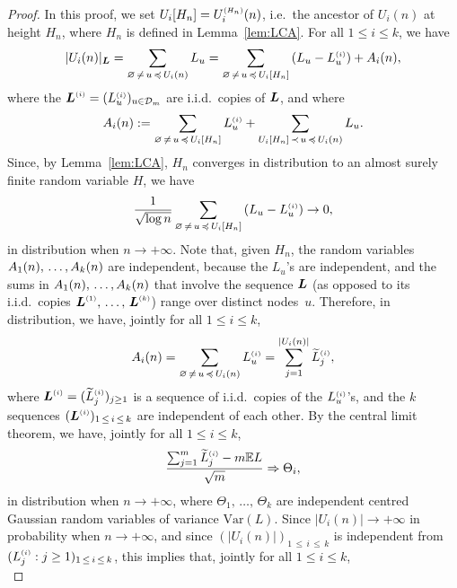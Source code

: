 \documentclass[10pt]{amsart}
\theoremstyle{definition}\newtheorem{defi}[theo]{Definition}\newtheorem{rema}[theo]{Remark}\newtheorem{exam}[theo]{Example}\newtheorem{exem}[theo]{Example}\newtheorem{nota}[theo]{Notation}
\newcommand{\bs}{\ensuremath{\boldsymbol}}
\newcommand{\sss}{\ensuremath{\scriptscriptstyle}}
\newcommand{\bbE}{\mathbb{E}}
\newcommand{\clD}{\mathcal{D}}
\newcommand{\Var}{\mathrm{Var}}
\begin{document}
\begin{proof}
In this proof, we set $U_i[H_n] = U_i^{\sss (H_n)}(n)$, i.e.\ the ancestor of $U_i(n)$ at height $H_n$, where $H_n$ is defined in Lemma~\ref{lem:LCA}. For all $1\leq i\leq k$, we have
\begin{equation}\label{eq:Ai}
|U_i(n)|_{\bs L} = \sum_{\varnothing\,\neq\,u\,\preccurlyeq\,U_i(n)} L_u = \sum_{\varnothing\,\neq\,u\,\preccurlyeq\,U_i[H_n]} \left(L_u - L_u^{\sss (i)}\right) + A_i(n),
\end{equation}
where the $\bs L^{\sss (i)} = (L_u^{\sss (i)})_{u\in\clD_m}$ are i.i.d.\ copies of $\bs L$, and where
\[
A_i(n):=\sum_{\varnothing\,\neq\,u\,\preccurlyeq\,U_i[H_n]} L^{\sss (i)}_u +\sum_{U_i[H_n]\,\prec\,u\,\preccurlyeq\,U_i(n)} L_u.
\]
Since, by Lemma~\ref{lem:LCA}, $H_n$ converges in distribution to an almost surely finite random variable $H$, we have
\begin{equation}\label{eq:LLN_change_dist}
\frac1{\sqrt{\log n}}
\sum_{\varnothing\,\neq\,u\,\preccurlyeq\,U_i[H_n]}\left(L_u-L_u^{\sss (i)}\right)
\to 0,
\end{equation}
in distribution when $n\to+\infty$. Note that, given $H_n$, the random variables $A_1(n),\,\ldots,\linebreak A_k(n)$ are independent, because the $L_u$'s are independent, and the sums in $A_1(n), \,\ldots,\linebreak A_k(n)$ that involve the sequence $\bs L$ (as opposed to its i.i.d.\ copies $\bs L^{\sss (1)}, \,\ldots,\, \bs L^{\sss (k)}$) range over distinct nodes~$u$. Therefore, in distribution, we have, jointly for all $1\leq i\leq k$,
\[
A_i(n)= \sum_{\varnothing\,\neq\,u\,\preccurlyeq\,U_i(n)} L^{\sss (i)}_u = \sum_{j=1}^{|U_i(n)|} \widetilde L^{\sss (i)}_j,
\]
where $\bs L^{\sss (i)} = (\widetilde L_j^{\sss (i)})_{j\geq 1}$ is a sequence of i.i.d.\ copies of the $L^{\sss (i)}_u$'s, and the $k$ sequences $(\bs L^{\sss (i)})_{1\,\leq\,i\,\leq\,k}$ are independent of each other. By the central limit theorem, we have, jointly for all $1\leq i\leq k$,
\[
\frac{\sum_{j=1}^m \widetilde L^{\sss (i)}_j - m\bbE L}{\sqrt m} \Rightarrow \Theta_i,
\]
in distribution when $n\to+\infty$, where $\Theta_1, \,\ldots,\,\Theta_k$ are {independent centred Gaussian random variables of variance $\Var(L)$}. Since $|U_i(n)|\to+\infty$ in probability when $n\to+\infty$, and since $(|U_i(n)|)_{1\,\leq\,i\,\leq\,k}$ is independent from $(L_j^{\sss (i)} : j\geq 1)_{1\,\leq\,i\,\leq\,k}$, this implies that, jointly for all $1\leq i\leq k$,
\begin{equation}\label{eq:CLT_A_i}

\end{equation}
\end{proof}
\end{document}
